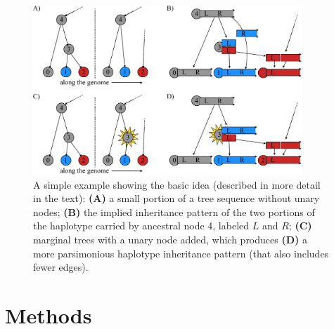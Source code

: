 \documentclass[10pt,twoside,lineno]{gsajnl}
\newcommand{\T}{\mathbb{T}}
\newcommand{\comment}[1]{{\color{violet} \it #1}}
\begin{document}
\begin{figure}
    \begin{center}
    \includegraphics[width=0.9\textwidth]{conceptual_figure.pdf}
    \end{center}
    \caption{
        A simple example showing the basic idea
        (described in more detail in the text):
        \textbf{(A)} a small portion of a tree sequence without unary nodes;
        \textbf{(B)} the implied inheritance pattern of the two portions of the haplotype carried by ancestral node 4,
        labeled $L$ and $R$;
        \textbf{(C)} marginal trees with a unary node added,
        which produces \textbf{(D)} a more parsimonious haplotype inheritance pattern
        (that also includes fewer edges).
        \label{fig:conceptual}
    }
\end{figure}

\section{Methods}

\end{document}
